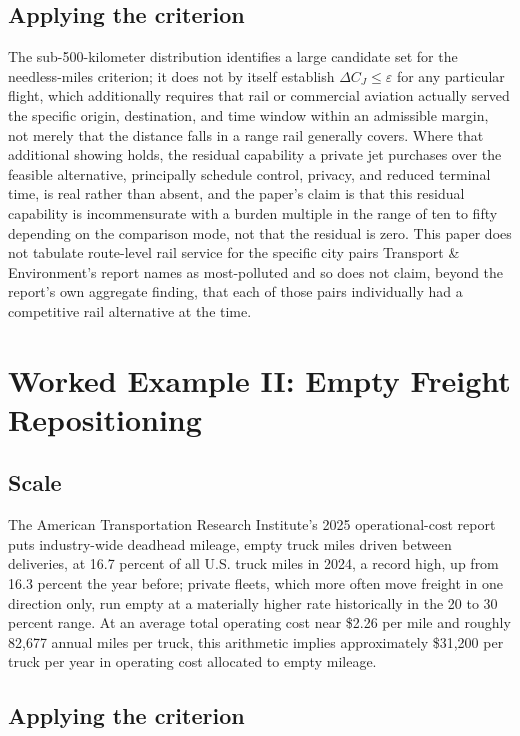 \documentclass[11pt]{article}
\begin{document}
\subsection{Applying the criterion}

The sub-500-kilometer distribution identifies a large candidate set for the needless-miles criterion; it does not by itself establish $\Delta C_J \leq \varepsilon$ for any particular flight, which additionally requires that rail or commercial aviation actually served the specific origin, destination, and time window within an admissible margin, not merely that the distance falls in a range rail generally covers. Where that additional showing holds, the residual capability a private jet purchases over the feasible alternative, principally schedule control, privacy, and reduced terminal time, is real rather than absent, and the paper's claim is that this residual capability is incommensurate with a burden multiple in the range of ten to fifty depending on the comparison mode, not that the residual is zero. This paper does not tabulate route-level rail service for the specific city pairs Transport \& Environment's report names as most-polluted and so does not claim, beyond the report's own aggregate finding, that each of those pairs individually had a competitive rail alternative at the time.

\section{Worked Example II: Empty Freight Repositioning}

\subsection{Scale}

The American Transportation Research Institute's 2025 operational-cost report puts industry-wide deadhead mileage, empty truck miles driven between deliveries, at 16.7 percent of all U.S. truck miles in 2024, a record high, up from 16.3 percent the year before; private fleets, which more often move freight in one direction only, run empty at a materially higher rate historically in the 20 to 30 percent range. At an average total operating cost near \$2.26 per mile and roughly 82{,}677 annual miles per truck, this arithmetic implies approximately \$31{,}200 per truck per year in operating cost allocated to empty mileage.

\subsection{Applying the criterion}
\end{document}
